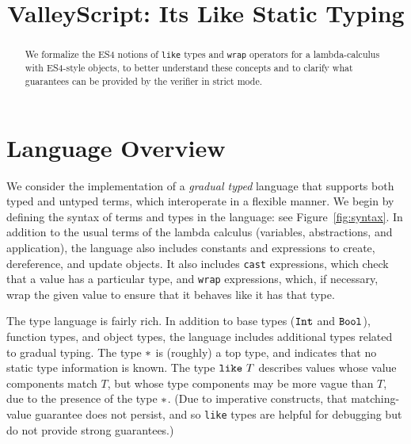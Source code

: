 \documentclass{article}
\newcommand{\Int}{\t{Int}}
\newcommand{\Bool}{\t{Bool}}
\newcommand{\dynamic}{\t{*}}
\renewcommand{\t}[1]{{\tt #1}}
\newcommand{\wrapty}[1]{\t{XXXX wrap}~#1}
\newcommand{\likety}[1]{\t{like}~#1}
\begin{document}
\title{ValleyScript: Its Like Static Typing
}

\maketitle

\begin{abstract}
We formalize the ES4 notions of \t{like} types and \t{wrap} operators for a lambda-calculus with ES4-style objects,
to better understand these concepts and to clarify what guarantees can be provided by the verifier in strict mode.
\end{abstract}

\section{Language Overview}

We consider the implementation of a \emph{gradual typed} language that supports both
typed and untyped terms, which interoperate in a flexible manner.
We begin by defining the syntax of terms and types in the language: see Figure~\ref{fig:syntax}.
In addition to the usual terms of the lambda calculus (variables, abstractions, and application), 
the language also includes constants and expressions to create, dereference, and update objects.
It also includes \t{cast} expressions, which check that a value has a particular type,
and \t{wrap} expressions, which, if necessary, wrap the given value to ensure that it behaves like it has that type. 

The type language is fairly rich. In addition to  base types ($\Int$ and $\Bool$), function types,
and object types, the language includes additional types related to gradual typing.
The type $\dynamic$ is (roughly) a top type, and indicates that no static type information is known.
The type $\likety{T}$ describes values whose value components match $T$, but whose type components may be more vague than $T$, due to the presence of the type $\dynamic$. (Due to imperative constructs, that matching-value guarantee does not persist, and so \t{like} types are helpful for debugging but do not provide strong guarantees.)


\end{document}
